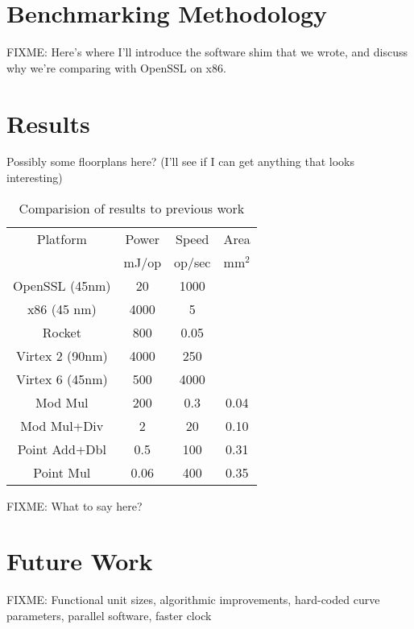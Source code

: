 \documentclass[twocolumn]{article}
\begin{document}
\section{Benchmarking Methodology}

FIXME: Here's where I'll introduce the software shim that we wrote,
and discuss why we're comparing with OpenSSL on x86.

\section{Results}

Possibly some floorplans here?
(I'll see if I can get anything that looks interesting)

\begin{table}[ht]
  \begin{center}
    \begin{tabular}{c|ccc}
      Platform        & Power & Speed  & Area \\
                      & mJ/op & op/sec & mm$^2$ \\
      \hline
      OpenSSL (45nm)  & 20    & 1000   &      \\
      x86 (45 nm)     & 4000  & 5      &      \\
      Rocket          & 800   & 0.05   &      \\
      Virtex 2 (90nm) & 4000  & 250    &      \\
      Virtex 6 (45nm) & 500   & 4000   &      \\
      \hline
      Mod Mul         & 200   & 0.3    & 0.04 \\
      Mod Mul+Div     & 2     & 20     & 0.10 \\
      Point Add+Dbl   & 0.5   & 100    & 0.31 \\
      Point Mul       & 0.06  & 400    & 0.35 \\
    \end{tabular}
  \end{center}

  \caption{Comparision of results to previous work
    \label{results}}
\end{table}

FIXME: What to say here?

\section{Future Work}

FIXME: Functional unit sizes, algorithmic improvements, hard-coded
curve parameters, parallel software, faster clock
\end{document}
